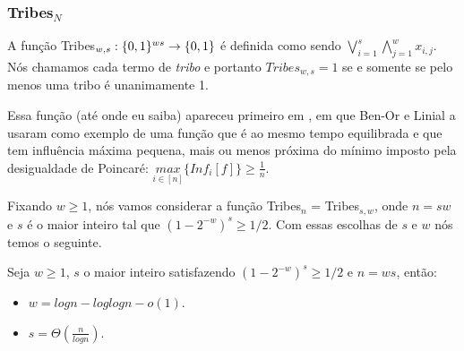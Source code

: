 
\subsubsection{Tribes$_{N}$}

A função Tribes$_{w, s}: \{0, 1\}^{ws} \to \{0, 1\}$ é definida como sendo $\bigvee_{i = 1}^{s}\bigwedge_{j = 1}^{w} x_{i, j}$. Nós chamamos cada termo de \emph{tribo} e portanto $Tribes_{w, s} = 1$ se e somente se pelo menos uma tribo é unanimamente 1.

Essa função (até onde eu saiba) apareceu primeiro em \cite{ben1990collective}, em que Ben-Or e Linial a usaram como exemplo de uma função que é ao mesmo tempo equilibrada e que tem influência máxima pequena, mais ou menos próxima do mínimo imposto pela desigualdade de Poincaré: $\underset{i \in [n]}{max}\{Inf_{i}[f]\} \geq \frac{1}{n}$.

Fixando $w \geq 1$, nós vamos considerar a função Tribes$_{n}$ = Tribes$_{s, w}$, onde $n = sw$ e $s$ é o maior inteiro tal que $(1 - 2^{-w})^{s} \geq 1/2$. Com essas escolhas de $s$ e $w$ nós temos o seguinte.

\begin{prop} \label{prop: tribes_n}

    Seja $w \geq 1$, $s$ o maior inteiro satisfazendo $(1 - 2^{-w})^{s} \geq 1/2$ e $n = ws$, então: 

    \begin{itemize}

        \item $w = logn - loglogn - o(1)$.

        \item $s = \Theta(\frac{n}{logn})$.

    \end{itemize}

\end{prop}

